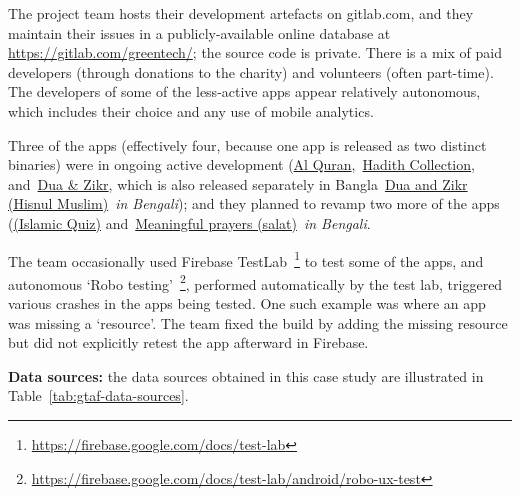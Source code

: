 
The project team hosts their development artefacts on gitlab.com, and they maintain their issues in a publicly-available online database at \url{https://gitlab.com/greentech/}; the source code is private. There is a mix of paid developers (through donations to the charity) and volunteers (often part-time). The developers of some of the less-active apps appear relatively autonomous, which includes their choice and any use of mobile analytics. 

Three of the apps (effectively four, because one app is released as two distinct binaries) were in ongoing active development (\href{https://play.google.com/store/apps/details?id=com.greentech.quran}{Al Quran},~\href{https://play.google.com/store/apps/details?id=com.greentech.hadith}{Hadith Collection}, and~\href{https://play.google.com/store/apps/details?id=com.greentech.hisnulmuslim}{Dua \& Zikr}, which is also released separately in Bangla~\href{https://play.google.com/store/apps/details?id=com.greentech.hisnulmuslimbn}{{Dua and Zikr (Hisnul Muslim)}}~\emph{in Bengali}); and they planned to revamp two more of the apps (\href{https://play.google.com/store/apps/details?id=com.greentech.islamicquiz}{(Islamic Quiz)} and~\href{https://play.google.com/store/apps/details?id=com.greentech.salatbn}{Meaningful prayers (salat)}~\textit{in Bengali}. %

The team occasionally used Firebase TestLab~\footnote{\url{https://firebase.google.com/docs/test-lab}} to test some of the apps, and autonomous `Robo testing'~\footnote{\url{https://firebase.google.com/docs/test-lab/android/robo-ux-test}}, performed automatically by the test lab, triggered various crashes in the apps being tested. One such example was where an app was missing a `resource'. The team fixed the build by adding the missing resource but did not explicitly retest the app afterward in Firebase.  

\textbf{Data sources:} the data sources obtained in this case study are illustrated in Table~\ref{tab:gtaf-data-sources}.


